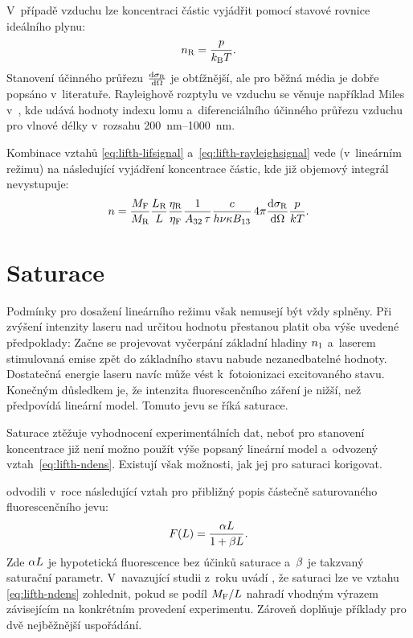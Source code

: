 V~případě vzduchu lze koncentraci částic vyjádřit pomocí
stavové rovnice ideálního plynu:
\begin{equation}
	n_\text{R} = \frac{p}{k_\text{B}T}.
\end{equation}
Stanovení účinného průřezu $\dv{\sigma_\text{R}}{\Omega}$ je obtížnější,
ale pro běžná média je dobře popsáno v~literatuře.
Rayleighově rozptylu ve vzduchu se věnuje například Miles v~\cite{rayleigh},
kde udává hodnoty indexu lomu a~diferenciálního účinného průřezu vzduchu
pro vlnové délky v~rozsahu \SIrange{200}{1000}{\nano\metre}.

Kombinace vztahů \eqref{eq:lifth-lifsignal} a~\eqref{eq:lifth-rayleighsignal}
vede (v~lineárním režimu) na následující vyjádření koncentrace částic,
kde již objemový integrál nevystupuje:
\begin{equation}
	\label{eq:lifth-ndens}
	n = \frac{M_\text{F}}{M_\text{R}}
	\frac{L_\text{R}}{L}\frac{\eta_\text{R}}{\eta_\text{F}}
	\frac{1}{A_{32}\,\tau}
	\frac{c}{h\nu\kappa B_{13}}
	\, 4\pi \dv{\sigma_\text{R}}{\Omega} \frac{p}{kT}.
\end{equation}

\section{Saturace}
\label{sec:lifth-saturation}
Podmínky pro dosažení lineárního režimu však nemusejí být vždy splněny.
Při zvýšení intenzity laseru nad určitou hodnotu přestanou platit oba
výše uvedené předpoklady:
Začne se projevovat vyčerpání základní hladiny $n_1$
a~laserem stimulovaná emise zpět do základního stavu nabude nezanedbatelné
hodnoty.
Dostatečná energie laseru navíc může vést k~fotoionizaci excitovaného stavu.
Konečným důsledkem je, že intenzita fluorescenčního záření je nižší,
než předpovídá lineární model.
Tomuto jevu se říká saturace.

Saturace ztěžuje vyhodnocení experimentálních dat, neboť pro stanovení
koncentrace již není možno použít výše popsaný lineární model
a~odvozený vztah~\eqref{eq:lifth-ndens}.
Existují však možnosti, jak jej pro saturaci korigovat.

 odvodili v~roce \citeyear{lif-saturation}
následující vztah pro přibližný popis částečně saturovaného
fluorescenčního jevu\autocite{lif-saturation}:
\begin{equation}
	F(L) = \frac{\alpha L}{1 + \beta L}.
\end{equation}
Zde $\alpha L$ je hypotetická fluorescence bez účinků saturace
a~$\beta$ je takzvaný saturační parametr.
V~navazující studii z~roku \citeyear{lif-pb} uvádí \citeauthor{lif-pb},
že saturaci lze ve vztahu \eqref{eq:lifth-ndens} zohlednit,
pokud se podíl $M_\text{F}/L$ nahradí vhodným výrazem
závisejícím na konkrétním provedení experimentu.
Zároveň doplňuje příklady pro dvě nejběžnější uspořádání.%
\autocite{lif-pb}

